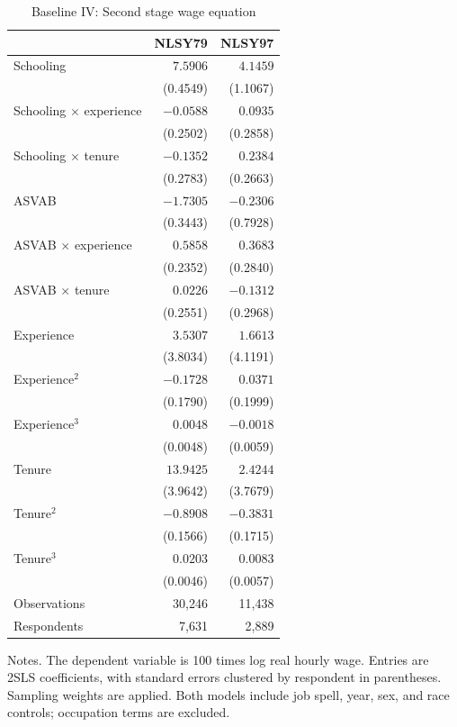 \documentclass[11pt]{article}
\begin{document}
\clearpage
\begin{table}[p]\centering
\caption{Baseline IV: Second stage wage equation}\label{tab:baseline_iv_secondstage}
\begin{threeparttable}\small
\begin{tabular*}{\textwidth}{@{\extracolsep{\fill}}lrr@{}}
\toprule
& NLSY79 & NLSY97 \\
\midrule
Schooling & $7.5906$ & $4.1459$ \\
 & (0.4549) & (1.1067) \\
Schooling $\times$ experience & $-0.0588$ & $0.0935$ \\
 & (0.2502) & (0.2858) \\
Schooling $\times$ tenure & $-0.1352$ & $0.2384$ \\
 & (0.2783) & (0.2663) \\
\addlinespace[3pt]
ASVAB & $-1.7305$ & $-0.2306$ \\
 & (0.3443) & (0.7928) \\
ASVAB $\times$ experience & $0.5858$ & $0.3683$ \\
 & (0.2352) & (0.2840) \\
ASVAB $\times$ tenure & $0.0226$ & $-0.1312$ \\
 & (0.2551) & (0.2968) \\
\addlinespace[3pt]
Experience & $3.5307$ & $1.6613$ \\
 & (3.8034) & (4.1191) \\
Experience$^2$ & $-0.1728$ & $0.0371$ \\
 & (0.1790) & (0.1999) \\
Experience$^3$ & $0.0048$ & $-0.0018$ \\
 & (0.0048) & (0.0059) \\
\addlinespace[3pt]
Tenure & $13.9425$ & $2.4244$ \\
 & (3.9642) & (3.7679) \\
Tenure$^2$ & $-0.8908$ & $-0.3831$ \\
 & (0.1566) & (0.1715) \\
Tenure$^3$ & $0.0203$ & $0.0083$ \\
 & (0.0046) & (0.0057) \\
\midrule
Observations & 30,246 & 11,438 \\
Respondents & 7,631 & 2,889 \\
\bottomrule\end{tabular*}
\begin{tablenotes}[flushleft]\footnotesize
\item Notes. The dependent variable is 100 times log real hourly wage. Entries are 2SLS coefficients, with standard errors clustered by respondent in parentheses. Sampling weights are applied. Both models include job spell, year, sex, and race controls; occupation terms are excluded.

\end{tablenotes}
\end{threeparttable}
\end{table}
\end{document}
